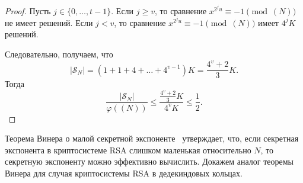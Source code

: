 \documentclass[_00_dissertation.tex]{subfiles}
\begin{document}
\begin{proof}
    Пусть $j \in \{0, \dots, t - 1\}$.
    Если $j \ge v$, то сравнение $x^{2^j u} \equiv -1 \pmod{(N)}$ не имеет решений.
    Если $j < v$, то сравнение $x^{2^j u} \equiv -1 \pmod{(N)}$ имеет $4^j K$ решений.
    
    Следовательно, получаем, что
    \begin{equation*}
        |\mathcal{S}_N| = \left(
            1 + 1 + 4 + \dots + 4^{v-1}
        \right)K = \frac{4^v + 2}{3}K.
    \end{equation*}
    Тогда
    \begin{equation*}
        \frac{|\mathcal{S}_N|}{\varphi((N))} \le \frac{\frac{4^v + 2}{3}K}{4^v K} \le \frac{1}{2}.
    \end{equation*}
\end{proof}

Теорема Винера о малой секретной экспоненте~\cite[c.~555]{source:Wiener} утверждает, что, если секретная экспонента в криптосистеме RSA слишком маленькая относительно $N$, то секретную экспоненту можно эффективно вычислить.
Докажем аналог теоремы Винера для случая криптосистемы RSA в дедекиндовых кольцах.
\end{document}
